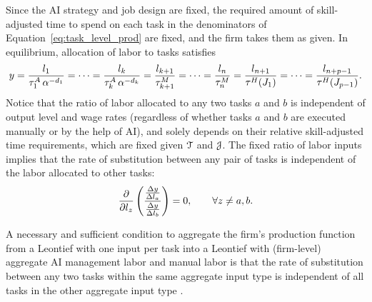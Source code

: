 Since the AI strategy and job design are fixed, the required amount of skill-adjusted time to spend on each task in the denominators of Equation~\eqref{eq:task_level_prod} are fixed, and the firm takes them as given.
In equilibrium, allocation of labor to tasks satisfies
\[
y=\frac{l_{1}}{\tau^{A}_{1}\,\alpha^{-d_{1}}}=\cdots=\frac{l_{k}}{\tau^{A}_{k}\,\alpha^{-d_{k}}}=\frac{l_{k+1}}{\tau^{M}_{k+1}}=\cdots=\frac{l_{n}}{\tau^{M}_{n}}=\frac{l_{n+1}}{\tau^{H}_{}(J_1)}=\cdots=\frac{l_{n+p-1}}{\tau^{H}_{}(J_{p-1})}.
\]
Notice that the ratio of labor allocated to any two tasks $a$ and $b$ is independent of output level and wage rates (regardless of whether tasks $a$ and $b$ are executed manually or by the help of AI), and solely depends on their relative skill-adjusted time requirements, which are fixed given $\mathcal{T}$ and $\mathcal{J}$.
The fixed ratio of labor inputs implies that the rate of substitution between any pair of tasks is independent of the labor allocated to other tasks:
\begin{equation}
\frac{\partial}{\partial l_{z}}\left(\frac{\frac{\Delta y}{\Delta l_{a}}}{\frac{\Delta y}{\Delta l_{b}}}\right)=0,\qquad\forall z\neq a,b.\label{eq:task_subst_rate_indep}
\end{equation}

A necessary and sufficient condition to aggregate the firm's production function from a Leontief with one input per task into a Leontief with (firm-level) aggregate AI management labor and manual labor is that the rate of substitution between any two tasks within the same aggregate input type is independent of all tasks in the other aggregate input type \citep{leontief1947introduction, fisher1965embodied, felipe2003aggregation}.

